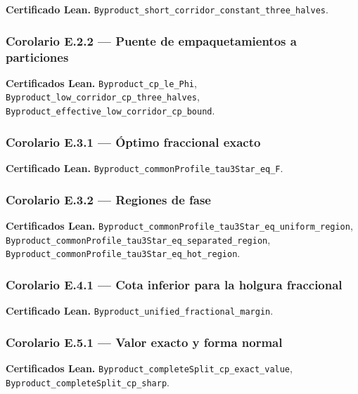 \documentclass[spanish,11pt,a4paper]{article}
\begin{document}
\textbf{Certificado Lean.}
\nolinkurl{Byproduct_short_corridor_constant_three_halves}.

\subsubsection{Corolario E.2.2 --- Puente de empaquetamientos a
particiones}\label{corolario-e.2.2-puente-de-empaquetamientos-a-particiones}

\textbf{Certificados Lean.} \nolinkurl{Byproduct_cp_le_Phi},
\nolinkurl{Byproduct_low_corridor_cp_three_halves},
\nolinkurl{Byproduct_effective_low_corridor_cp_bound}.

\subsubsection{Corolario E.3.1 --- Óptimo fraccional
exacto}\label{corolario-e.3.1-uxf3ptimo-fraccional-exacto}

\textbf{Certificado Lean.}
\nolinkurl{Byproduct_commonProfile_tau3Star_eq_F}.

\subsubsection{Corolario E.3.2 --- Regiones de
fase}\label{corolario-e.3.2-regiones-de-fase}

\textbf{Certificados Lean.}
\nolinkurl{Byproduct_commonProfile_tau3Star_eq_uniform_region},
\nolinkurl{Byproduct_commonProfile_tau3Star_eq_separated_region},
\nolinkurl{Byproduct_commonProfile_tau3Star_eq_hot_region}.

\subsubsection{Corolario E.4.1 --- Cota inferior para la holgura
fraccional}\label{corolario-e.4.1-cota-inferior-para-la-holgura-fraccional}

\textbf{Certificado Lean.}
\nolinkurl{Byproduct_unified_fractional_margin}.

\subsubsection{Corolario E.5.1 --- Valor exacto y forma
normal}\label{corolario-e.5.1-valor-exacto-y-forma-normal}

\textbf{Certificados Lean.}
\nolinkurl{Byproduct_completeSplit_cp_exact_value},
\nolinkurl{Byproduct_completeSplit_cp_sharp}.
\end{document}

